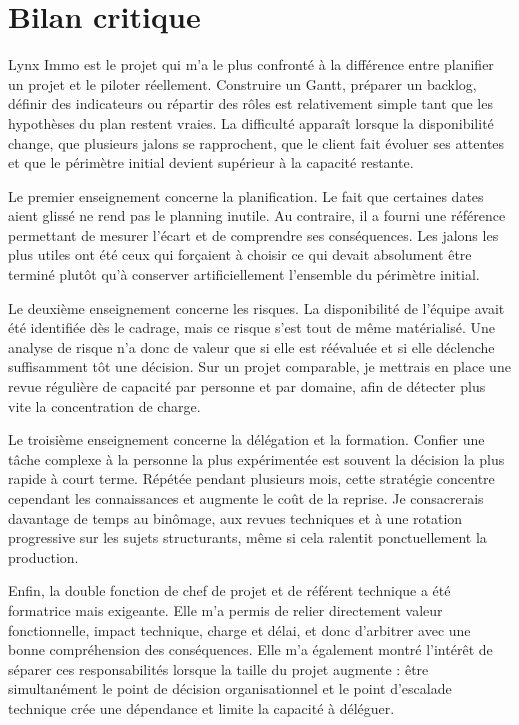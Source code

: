 \section{Bilan critique}

Lynx Immo est le projet qui m'a le plus confronté à la différence entre planifier un projet et le piloter réellement. Construire un Gantt, préparer un backlog, définir des indicateurs ou répartir des rôles est relativement simple tant que les hypothèses du plan restent vraies. La difficulté apparaît lorsque la disponibilité change, que plusieurs jalons se rapprochent, que le client fait évoluer ses attentes et que le périmètre initial devient supérieur à la capacité restante.

Le premier enseignement concerne la planification. Le fait que certaines dates aient glissé ne rend pas le planning inutile. Au contraire, il a fourni une référence permettant de mesurer l'écart et de comprendre ses conséquences. Les jalons les plus utiles ont été ceux qui forçaient à choisir ce qui devait absolument être terminé plutôt qu'à conserver artificiellement l'ensemble du périmètre initial.

Le deuxième enseignement concerne les risques. La disponibilité de l'équipe avait été identifiée dès le cadrage, mais ce risque s'est tout de même matérialisé. Une analyse de risque n'a donc de valeur que si elle est réévaluée et si elle déclenche suffisamment tôt une décision. Sur un projet comparable, je mettrais en place une revue régulière de capacité par personne et par domaine, afin de détecter plus vite la concentration de charge.

Le troisième enseignement concerne la délégation et la formation. Confier une tâche complexe à la personne la plus expérimentée est souvent la décision la plus rapide à court terme. Répétée pendant plusieurs mois, cette stratégie concentre cependant les connaissances et augmente le coût de la reprise. Je consacrerais davantage de temps au binômage, aux revues techniques et à une rotation progressive sur les sujets structurants, même si cela ralentit ponctuellement la production.

Enfin, la double fonction de chef de projet et de référent technique a été formatrice mais exigeante. Elle m'a permis de relier directement valeur fonctionnelle, impact technique, charge et délai, et donc d'arbitrer avec une bonne compréhension des conséquences. Elle m'a également montré l'intérêt de séparer ces responsabilités lorsque la taille du projet augmente : être simultanément le point de décision organisationnel et le point d'escalade technique crée une dépendance et limite la capacité à déléguer.

